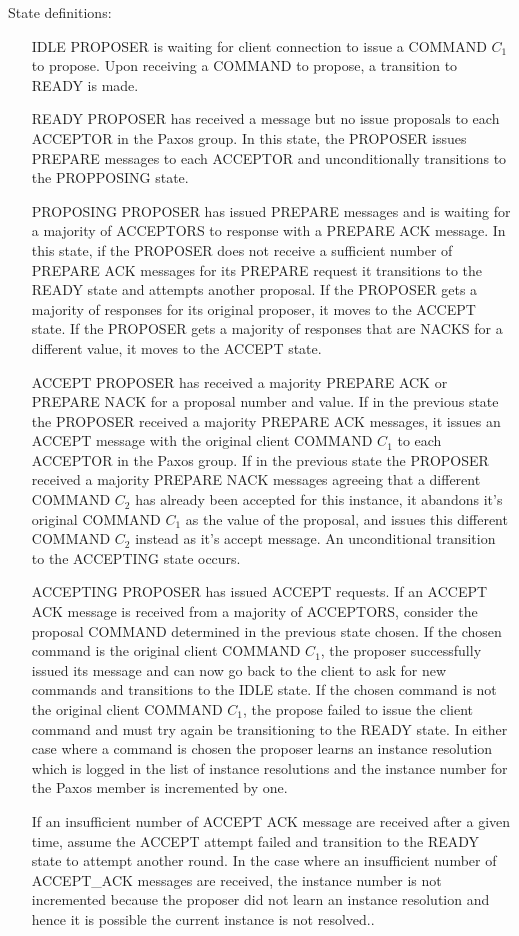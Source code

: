 \documentclass{article}
\begin{document}
State definitions:
\begin{itemize}
\item[IDLE] PROPOSER is waiting for client connection to issue a COMMAND $C_1$ to propose. 
  Upon receiving a COMMAND to propose, a transition to READY is made.
\item[READY] PROPOSER has received a message but no issue proposals to each ACCEPTOR in the Paxos group.
  In this state, the PROPOSER issues PREPARE messages to each ACCEPTOR and unconditionally transitions to the PROPPOSING state.
\item[PROPOSING] PROPOSER has issued PREPARE messages and is waiting for a majority of ACCEPTORS to response with a PREPARE ACK message.
  In this state, if the PROPOSER does not receive a sufficient number of PREPARE ACK messages for its PREPARE request it transitions to the READY state and attempts another proposal.
  If the PROPOSER gets a majority of responses for its original proposer, it moves to the ACCEPT state.
  If the PROPOSER gets a majority of responses that are NACKS for a different value, it moves to the ACCEPT state.
\item[ACCEPT] PROPOSER has received a majority PREPARE ACK or PREPARE NACK for a proposal number and value.
  If in the previous state the PROPOSER received a majority PREPARE ACK messages, it issues an ACCEPT message with the original client COMMAND $C_1$ to each ACCEPTOR in the Paxos group.
  If in the previous state the PROPOSER received a majority PREPARE NACK messages agreeing that a different COMMAND $C_2$ has already been accepted for this instance, it abandons it's original COMMAND $C_1$ as the value of the proposal, and issues this different COMMAND $C_2$ instead as it's accept message.
  An unconditional transition to the ACCEPTING state occurs.
\item[ACCEPTING] PROPOSER has issued ACCEPT requests. 
  If an ACCEPT ACK message is received from a majority of ACCEPTORS, consider the proposal COMMAND determined in the previous state chosen.
  If the chosen command is the original client COMMAND $C_1$, the proposer successfully issued its message and can now go back to the client to ask for new commands and transitions to the IDLE state.
  If the chosen command is not the original client COMMAND $C_1$, the propose failed to issue the client command and must try again be transitioning to the READY state.
  In either case where a command is chosen the proposer learns an instance resolution which is logged in the list of instance resolutions and the instance number for the Paxos member is incremented by one.

  If an insufficient number of ACCEPT ACK message are received after a given time, assume the ACCEPT attempt failed and transition to the READY state to attempt another round.
  In the case where an insufficient number of ACCEPT\_ACK messages are received, the instance number is not incremented because the proposer did not learn an instance resolution and hence it is possible the current instance is not resolved..
\end{itemize}
\end{document}
